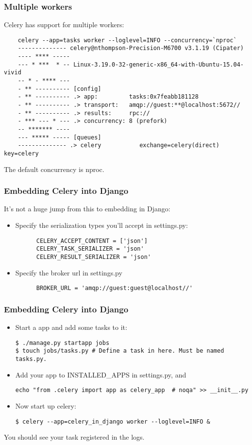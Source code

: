 \documentclass[9pt]{beamer}
\begin{document}
\begin{frame}[fragile]
  \frametitle{Multiple workers}
  Celery has support for multiple workers:
  \begin{verbatim}
    celery --app=tasks worker --loglevel=INFO --concurrency=`nproc`
    -------------- celery@nthompson-Precision-M6700 v3.1.19 (Cipater)
    ---- **** -----
    --- * ***  * -- Linux-3.19.0-32-generic-x86_64-with-Ubuntu-15.04-vivid
    -- * - **** ---
    - ** ---------- [config]
    - ** ---------- .> app:         tasks:0x7feabb181128
    - ** ---------- .> transport:   amqp://guest:**@localhost:5672//
    - ** ---------- .> results:     rpc://
    - *** --- * --- .> concurrency: 8 (prefork)
    -- ******* ----
    --- ***** ----- [queues]
    -------------- .> celery           exchange=celery(direct) key=celery
  \end{verbatim}
  The default concurrency is nproc.
\end{frame}

\begin{frame}[fragile]
  \frametitle{Embedding Celery into Django}
  It's not a huge jump from this to embedding in Django:
  \begin{itemize}
  \item Specify the serialization types you'll accept in settings.py:
    \begin{verbatim}
      CELERY_ACCEPT_CONTENT = ['json']
      CELERY_TASK_SERIALIZER = 'json'
      CELERY_RESULT_SERIALIZER = 'json'
    \end{verbatim}
    \pause
  \item Specify the broker url in settings.py
    \begin{verbatim}
      BROKER_URL = 'amqp://guest:guest@localhost//'
    \end{verbatim}
  \end{itemize}
\end{frame}

\begin{frame}[fragile]
  \frametitle{Embedding Celery into Django}
  \begin{itemize}
  \item Start a app and add some tasks to it:
    \begin{verbatim}
$ ./manage.py startapp jobs
$ touch jobs/tasks.py # Define a task in here. Must be named tasks.py.
    \end{verbatim}
    \pause
  \item Add your app to INSTALLED\_APPS in settings.py, and
    \begin{verbatim}
echo "from .celery import app as celery_app  # noqa" >> __init__.py
    \end{verbatim}
    \pause
  \item Now start up celery:
    \begin{verbatim}
$ celery --app=celery_in_django worker --loglevel=INFO &
    \end{verbatim}
  \end{itemize}
  You should see your task registered in the logs.
\end{frame}
\end{document}
